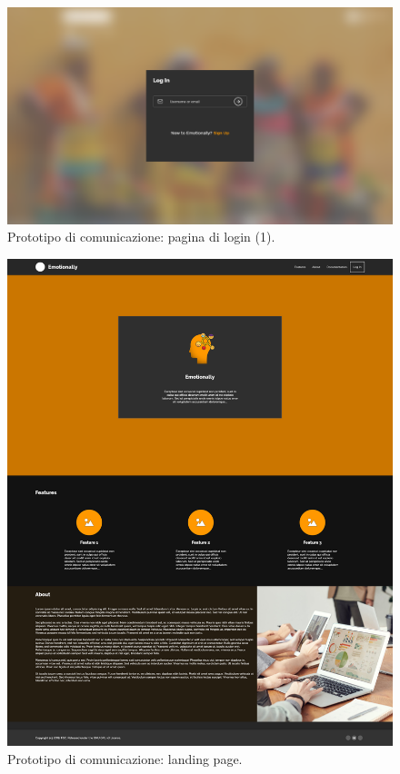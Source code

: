 
\begin{figure}[H]
	\centering
	\caption{Prototipo di comunicazione: pagina di login (1).}
	\label{fig:prototipo-comunicazione:login-1}
	\includegraphics[width=\textwidth]{images/prototipo-comunicazione/login-1.png}
\end{figure}

\begin{figure}[H]
	\centering
	\caption{Prototipo di comunicazione: landing page.}
	\label{fig:prototipo-comunicazione:landing-page}
	\includegraphics[width=\textwidth]{images/prototipo-comunicazione/Landing.png}
\end{figure}

